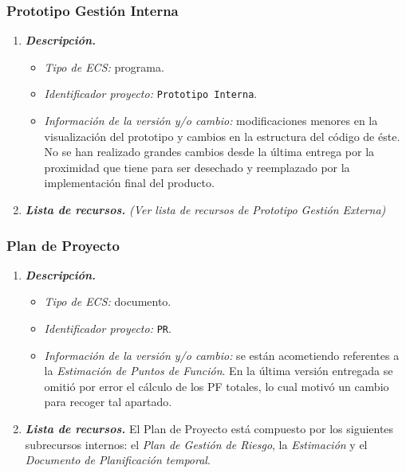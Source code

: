 \documentclass[11pt, a4paper, twoside, titlepage]{article}
\begin{document}
			\subsubsection{Prototipo Gestión Interna}
			\begin{enumerate}
				\item {\itshape \bfseries Descripción.}
						\begin{itemize}
							\item \textit{Tipo de ECS:} programa.
							\item \textit{Identificador proyecto:} \verb|Prototipo Interna|.
							\item \textit{Información de la versión y/o cambio:} modificaciones menores en la visualización del prototipo y cambios en la estructura del código de éste. No se han realizado grandes cambios desde la última entrega por la proximidad que tiene para ser desechado y reemplazado por la implementación final del producto.
						\end{itemize}

					\item {\itshape \bfseries Lista de recursos.}
						\textit{(Ver lista de recursos de Prototipo Gestión Externa)}
				\end{enumerate}

			\subsubsection{Plan de Proyecto}
			\begin{enumerate}
				\item {\itshape \bfseries Descripción.}
						\begin{itemize}
							\item \textit{Tipo de ECS:} documento.
							\item \textit{Identificador proyecto:} \verb|PR|.
							\item \textit{Información de la versión y/o cambio:} se están acometiendo referentes a la \textit{Estimación de Puntos de Función}. En la última versión entregada se omitió por error el cálculo de los PF totales, lo cual motivó un cambio para recoger tal apartado.
						\end{itemize}

					\item {\itshape \bfseries Lista de recursos.}
						El Plan de Proyecto está compuesto por los siguientes subrecursos internos: el \textit{Plan de Gestión de Riesgo}, la \textit{Estimación} y el \textit{Documento de Planificación temporal}.
				\end{enumerate}
\end{document}
